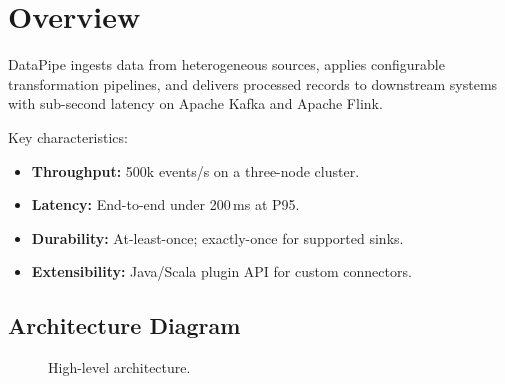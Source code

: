\documentclass[
    language=english,
    doctype=article,
    institution=none,
]{../../omnilatex}
\begin{document}
\maketitle

\begin{abstract}
DataPipe is an open-source streaming ETL (Extract, Transform, Load) platform
for real-time data integration.  This guide covers architecture, installation,
configuration, APIs, troubleshooting, and version history.
\end{abstract}

\tableofcontents

\section{Overview}
\label{sec:overview}

DataPipe ingests data from heterogeneous sources, applies configurable
transformation pipelines, and delivers processed records to downstream systems
with sub-second latency on Apache Kafka and Apache Flink.

Key characteristics:
\begin{itemize}
    \item \textbf{Throughput:} 500k events/s on a three-node cluster.
    \item \textbf{Latency:} End-to-end under 200\,ms at P95.
    \item \textbf{Durability:} At-least-once; exactly-once for supported sinks.
    \item \textbf{Extensibility:} Java/Scala plugin API for custom connectors.
\end{itemize}

\subsection{Architecture Diagram}

\begin{figure}[htbp]
    \centering
    \caption{High-level architecture.}
    \label{fig:arch}
\end{figure}
\end{document}

